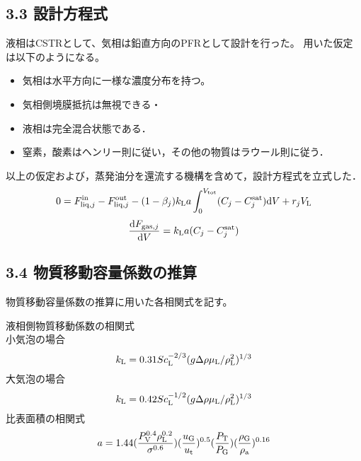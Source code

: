 \documentclass[platex, a4j]{jsarticle}
\begin{document}
\subsection*{3.3 設計方程式}
液相はCSTRとして、気相は鉛直方向のPFRとして設計を行った。
用いた仮定は以下のようになる。
\begin{itemize}
    \item 気相は水平方向に一様な濃度分布を持つ。\\
    \item 気相側境膜抵抗は無視できる・\\
    \item 液相は完全混合状態である．\\
    \item 窒素，酸素はヘンリー則に従い，その他の物質はラウール則に従う．
\end{itemize}
以上の仮定および，蒸発油分を還流する機構を含めて，設計方程式を立式した．\\
\begin{equation}\nonumber
    0=F^{{\rm in}}_{{\rm liq},j}-F^{{\rm out}}_{{\rm liq},j} -(1-\beta_j) k_{{\rm L}}a
    \int^{V_{{\rm tot}}}_0(C_j - C^{{\rm sat}}_j){\rm d}V + r_j V_{{\rm L}}
\end{equation}
\begin{equation}\nonumber
    \frac{{\rm d}F_{{\rm gas},j}}{{\rm d}V} = k_{{\rm L}}a(C_j - C^{{\rm sat}}_j)
\end{equation}

\subsection*{3.4 物質移動容量係数の推算}
物質移動容量係数の推算に用いた各相関式を記す。

液相側物質移動係数の相関式\\
小気泡の場合
\begin{equation}
    k_{{\rm L}} = 0.31Sc_{{\rm L}}^{-2/3}(g \Delta \rho \mu_{{\rm L}}/\rho_{{\rm L}}^2)^{1/3}
\end{equation}
大気泡の場合
\begin{equation}
    k_{{\rm L}} = 0.42Sc_{{\rm L}}^{-1/2}(g \Delta \rho \mu_{{\rm L}}/\rho_{{\rm L}}^2)^{1/3}
\end{equation}
比表面積の相関式
\begin{equation}
    a = 1.44(\frac{P_{{\rm V}}^{0.4} \rho_{{\rm L}}^{0.2} }{ \sigma^{0.6}})(\frac{u_{{\rm G}}}{u_{{\rm t}}})^{0.5}(\frac{P_{{\rm T}}}{P_{{\rm G}}})(\frac{\rho_{{\rm G}}}{\rho_{{\rm a}}})^{0.16}
\end{equation}
\end{document}
